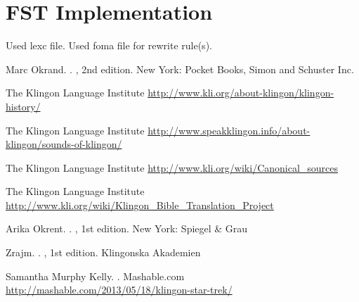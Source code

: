\documentclass[11pt]{article}
\begin{document}
\section{FST Implementation}

Used lexc file.
Used foma file for rewrite rule(s).

%
%

\begin{thebibliography}{}

Marc Okrand.
.
, 2nd edition.
\newblock New York: Pocket Books, Simon and Schuster Inc.

\newblock The Klingon Language Institute
\newblock \url{http://www.kli.org/about-klingon/klingon-history/}

\newblock The Klingon Language Institute
\newblock \url{http://www.speakklingon.info/about-klingon/sounds-of-klingon/}

\newblock The Klingon Language Institute
\newblock \url{http://www.kli.org/wiki/Canonical_sources}

\newblock The Klingon Language Institute
\newblock \url{http://www.kli.org/wiki/Klingon_Bible_Translation_Project}

Arika Okrent.
.
, 1st edition.
\newblock New York: Spiegel \& Grau

Zrajm.
.
, 1st edition.
\newblock Klingonska Akademien

Samantha Murphy Kelly.
.
\newblock Mashable.com
\newblock \url{http://mashable.com/2013/05/18/klingon-star-trek/}

\end{thebibliography}
\end{document}
